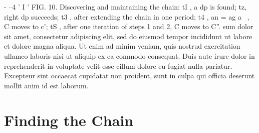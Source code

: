 \documentclass[11pt,a4paper]{report}
\begin{document}
- --4 ’
I ’
FIG. 10. Discovering and maintaining the chain: tI , a dp is found; tz, right dp succeeds;
t3 , after extending the chain in one period; t4 , an = ag a~ , C moves to c’; tS , after one iteration
of steps 1 and 2, C moves to C”. 
sum dolor sit amet, consectetur adipiscing elit, sed do eiusmod tempor incididunt ut labore et dolore magna aliqua. Ut enim ad minim veniam, quis nostrud exercitation ullamco laboris nisi ut aliquip ex ea commodo consequat. Duis aute irure dolor in reprehenderit in voluptate velit esse cillum dolore eu fugiat nulla pariatur. Excepteur sint occaecat cupidatat non proident, sunt in culpa qui officia deserunt mollit anim id est laborum.

\chapter{Finding the Chain}
\end{document}
